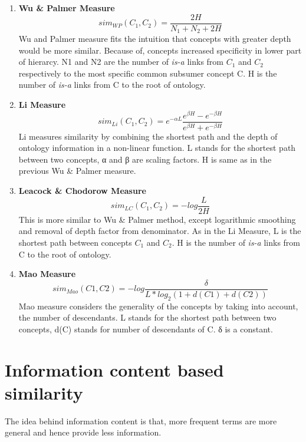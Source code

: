 \begin{enumerate}


\item{\textbf{Wu \& Palmer Measure}}
\begin{equation}
sim_{WP} (C_1 , C_2 ) = \frac{ 2H } { N_1+N_2+2H } 
\end{equation}
Wu and Palmer measure fits the intuition that concepts with greater depth would be more similar. Because of, concepts increased specificity in lower part of hierarcy.
N1 and N2 are the number of \textit{is-a} links from $C_1$ and $C_2$ respectively to the most specific common subsumer concept C. H is the number of \textit{is-a} links from C to the root of ontology.


\item{\textbf{Li Measure}}
\begin{equation}
sim_{Li} (C_1 , C_2 ) = e^{-\alpha L} \frac{ e^{\beta H} - e^{-\beta H} } { e^{\beta H} + e^{-\beta H} } 
\end{equation}
Li measures similarity by combining the shortest path and the depth of ontology information in a non-linear function. L stands for the shortest path between two concepts, α and β are scaling factors. H is same as in the previous Wu \& Palmer measure.


\item{\textbf{Leacock \& Chodorow Measure}}
\begin{equation}
sim_{LC} (C_1 , C_2 ) = -log \frac{L}{2H}  
\end{equation}
This is more similar to Wu \& Palmer method, except logarithmic smoothing and removal of depth factor from denominator. As in the Li Measure, L is the shortest path between concepts $C_1$ and $C_2$. H is the number of \textit{is-a} links from C to the root of ontology.


\item{\textbf{Mao Measure}}
\begin{equation}
sim_{Mao} (C1 , C2 ) = -log \frac{ \delta }{ L * log_{2}( 1+ d(C1) + d(C2) ) }  
\end{equation}
Mao measure considers the generality of the concepts by taking into account, the number of descendants. L stands for the shortest path between two concepts, d(C) stands for number of descendants of C. δ is a constant.
\end{enumerate}


\section{Information content based similarity} 
The idea behind information content is that, more frequent terms
are more general and hence provide less information. 

